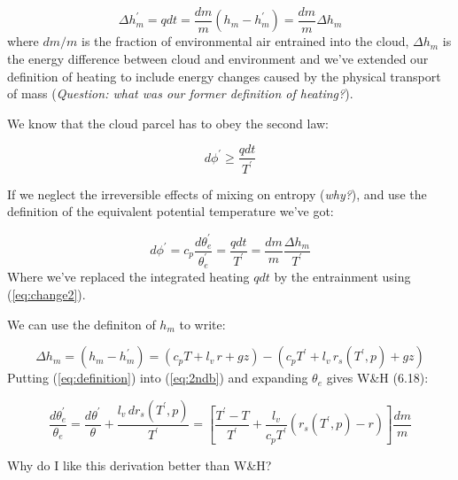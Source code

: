 \documentclass[12pt]{article}
\begin{document}
\begin{equation}
  \label{eq:change2}
\Delta h_m^\prime = q dt = \frac{dm}{m} (h_m - h_m^\prime) = \frac{dm}{m} \Delta h_m
\end{equation}
where $dm/m$ is the fraction of environmental air entrained into the cloud,
$\Delta h_m$ is the energy difference between cloud and environment and we've extended
our definition of heating to include energy changes caused by the physical transport
of mass (\textit{Question: what was our former definition of heating?}).

We know that the cloud parcel has to obey the second law:

\begin{equation}
  \label{eq:2nd}
  d\phi^\prime \geq \frac{q dt}{T^\prime}
\end{equation}

If we neglect the irreversible effects of mixing on entropy (\textit{why?}), and use the definition of
the equivalent potential temperature we've got:

\begin{equation}
  \label{eq:2ndb}
  d\phi^\prime = c_p \frac{d\theta_e^\prime}{\theta_e^\prime} = \frac{q dt}{T^\prime} = 
          \frac{dm}{m} \frac{\Delta h_m}{T^\prime}
\end{equation}
Where we've replaced the integrated heating $q dt$ by the entrainment using (\ref{eq:change2}).

We can use the definiton of $h_m$ to write:

\begin{equation}
  \label{eq:definition}
  \Delta h_m = (h_m - h_m^\prime) = (c_p T + l_v\, r + g z) - (c_p T^\prime + l_v\, r_s(T^\prime,p) + g z)
\end{equation}
Putting (\ref{eq:definition}) into (\ref{eq:2ndb}) and expanding $\theta_e$ gives
W\&H (6.18):

\begin{equation}
  \label{eq:whcorr}
\frac{d\theta_e^\prime}{\theta_e} =   \frac{d\theta^\prime}{\theta} + \frac{l_v\,dr_s(T^\prime,p)}{T^\prime} = 
   \left [ \frac{T^\prime - T}{T^\prime} + \frac{l_v}{c_p T^\prime} (r_s(T^\prime,p) - r) \right ]
   \frac{dm}{m}
\end{equation}

Why do I like this derivation better than W\&H? 
\end{document}
